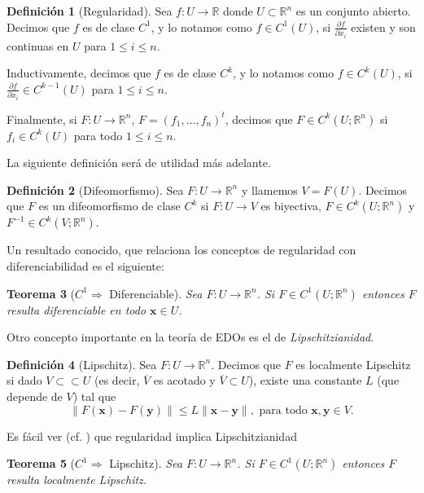 \documentclass[12pt, a4paper]{amsbook}
\newcommand{\R}{{\mathbb R}}
\newcommand{\xx}{{\mathbf x}}
\newcommand{\yy}{{\mathbf y}}
\newtheorem{teo}{Teorema}[section]
\theoremstyle{remark}
\theoremstyle{definition}
\newtheorem{defi}[teo]{Definición}
\numberwithin{section}{chapter}
\numberwithin{subsection}{section}
\numberwithin{equation}{section}
\numberwithin{figure}{chapter}
\begin{document}
\begin{defi}[Regularidad]
Sea $f\colon U\to \R$ donde $U\subset \R^n$ es un conjunto abierto. Decimos que $f$ es de clase $C^1$, y lo notamos como $f\in C^1(U)$, si $\frac{\partial f}{\partial x_i}$ existen y son continuas en $U$ para $1\le i\le n$.

Inductivamente, decimos que $f$ es de clase $C^k$, y lo notamos como $f\in C^k(U)$,  si $\frac{\partial f}{\partial x_i}\in C^{k-1}(U)$ para $1\le i\le n$.

Finalmente, si $F\colon U\to \R^n$, $F=(f_1,\dots, f_n)^t$, decimos que $F\in C^k(U; \R^n)$ si $f_i\in C^k(U)$ para todo $1\le i\le n$.
\end{defi}

La siguiente definición será de utilidad más adelante.
\begin{defi}[Difeomorfismo]
Sea  $F\colon U\to \R^n$ y llamemos $V=F(U)$. Decimos que $F$ es un difeomorfismo de clase $C^k$ si $F\colon U\to V$ es biyectiva, $F\in C^k(U; \R^n)$ y $F^{-1}\in C^k(V;\R^n)$. 
\end{defi}


Un resultado conocido, que relaciona los conceptos de regularidad con diferenciabilidad es el siguiente:
\begin{teo}[$C^1\Rightarrow$ Diferenciable]
Sea $F\colon U\to \R^n$. Si $F\in C^1(U; \R^n)$ entonces $F$ resulta diferenciable en todo $\xx\in U$.
\end{teo}


Otro concepto importante en la teoría de EDOs es el de {\em Lipschitzianidad}.
\begin{defi}[Lipschitz]
Sea $F\colon U\to \R^n$. Decimos que $F$ es localmente Lipschitz si dado $V\subset\subset U$ (es decir, $\overline V$ es acotado y $\overline V\subset U$), existe una constante $L$ (que depende de $V$) tal que
$$
\|F(\xx) - F(\yy)\|\le L\|\xx-\yy\|, \text{ para todo } \xx, \yy\in V.
$$
\end{defi}

Es fácil ver (cf. \cite{Wolanski}) que regularidad implica Lipschitzianidad
\begin{teo}[$C^1\Rightarrow$ Lipschitz]
Sea $F\colon U\to \R^n$. Si $F\in C^1(U; \R^n)$ entonces $F$ resulta localmente Lipschitz.
\end{teo}
\end{document}
